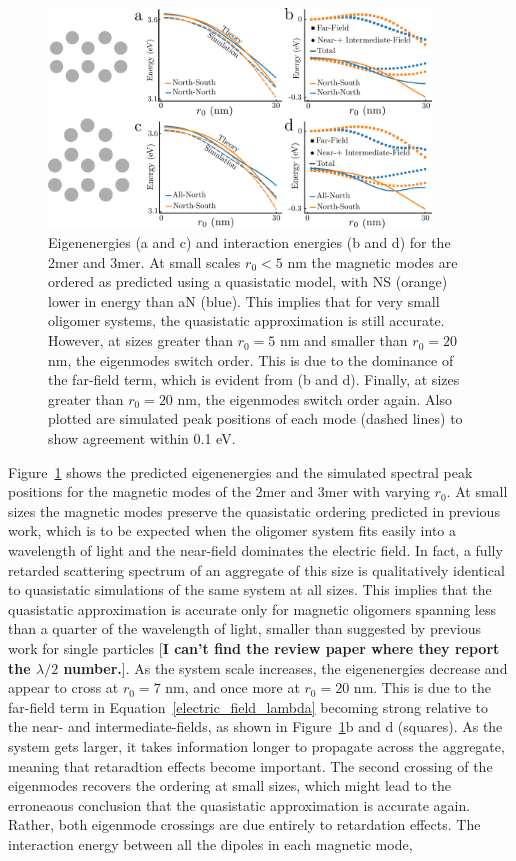 \documentclass[journal=apchd5,manuscript=article]{achemso}
\begin{document}
\begin{figure}
\includegraphics[width=4in]{2mer-3mer-eig.pdf}
\caption{Eigenenergies (a and c) and interaction energies (b and d) for the 2mer and 3mer. At small scales $r_0 < 5$ nm the magnetic modes are ordered as predicted using a quasistatic model, with NS (orange) lower in energy than aN (blue). This implies that for very small oligomer systems, the quasistatic approximation is still accurate. However, at sizes greater than $r_0 = 5$ nm and smaller than $r_0 = 20$ nm, the eigenmodes switch order. This is due to the dominance of the far-field term, which is evident from (b and d). Finally, at sizes greater than $r_0 = 20$ nm, the eigenmodes switch order again. Also plotted are simulated peak positions of each mode (dashed lines) to show agreement within 0.1 eV.}
\label{scaling}
\end{figure}

Figure~\ref{scaling} shows the predicted eigenenergies and the simulated spectral peak positions for the magnetic modes of the 2mer and 3mer with varying $r_0$. At small sizes the magnetic modes preserve the quasistatic ordering predicted in previous work, which is to be expected when the oligomer system fits easily into a wavelength of light and the near-field dominates the electric field\cite{Cherqui2014}. In fact, a fully retarded scattering spectrum of an aggregate of this size is qualitatively identical to quasistatic simulations of the same system at all sizes. This implies that the quasistatic approximation is accurate only for magnetic oligomers spanning less than a quarter of the wavelength of light, smaller than suggested by previous work for single particles [\textbf{I can't find the review paper where they report the $\lambda/2$ number.}]. As the system scale increases, the eigenenergies decrease and appear to cross at $r_0 = 7$ nm, and once more at $r_0 = 20$ nm. This is due to the far-field term in Equation~\ref{electric_field_lambda} becoming strong relative to the near- and intermediate-fields, as shown in Figure~\ref{scaling}b and d (squares). As the system gets larger, it takes information longer to propagate across the aggregate, meaning that retaradtion effects become important. The second crossing of the eigenmodes recovers the ordering at small sizes, which might lead to the erroneaous conclusion that the quasistatic approximation is accurate again. Rather, both eigenmode crossings are due entirely to retardation effects. The interaction energy between all the dipoles in each magnetic mode,
\end{document}
